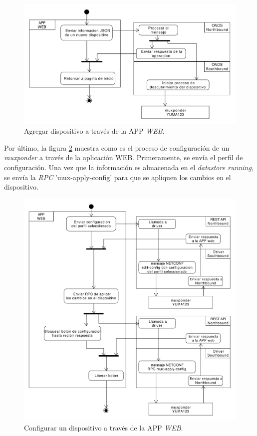 \begin{itemize}
    \begin{figure}[H]
        \centering
        \includegraphics[scale=0.45]{Figures/agregar_disp_web.pdf}
        \caption{Agregar dispositivo a través de la APP \textit{WEB}.}
        \label{fig:agregar_disp_web}
      \end{figure}

    Por último, la figura \ref{fig:config_disp_web} muestra como es el proceso de configuración de un \textit{muxponder} a través de la aplicación WEB. Primeramente, se envía el perfil de configuración. Una vez que la información es almacenada en el \textit{datastore running}, se envía la \textit{RPC} 'mux-apply-config' para que se apliquen los cambios en el dispositivo.

    \begin{figure}[H]
        \centering
        \includegraphics[scale=0.45]{Figures/config_disp_web.pdf}
        \caption{Configurar un dispositivo a través de la APP \textit{WEB}.}
        \label{fig:config_disp_web}
      \end{figure}


\end{itemize}
